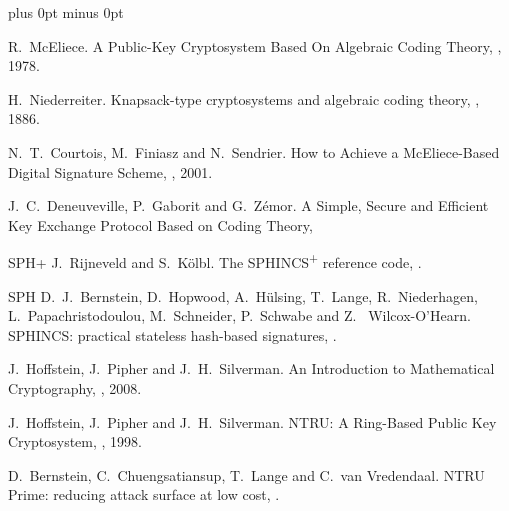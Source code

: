 \documentclass[a4paper,11pt]{article}
\begin{document}
\begin{otherlanguage}{english}
\begin{multicols}{2}


\begin{thebibliography}{1}
\itemsep=0cm plus 0pt minus 0pt

R.~McEliece.
\newblock A Public-Key Cryptosystem Based On Algebraic Coding Theory,
, 1978.

H.~Niederreiter.
\newblock Knapsack-type cryptosystems and algebraic coding theory,
, 1886.

N.~T.~Courtois, M.~Finiasz and N.~Sendrier.
\newblock How to Achieve a McEliece-Based Digital Signature Scheme,
, 2001.

J.~C.~Deneuveville, P.~Gaborit and G.~Zémor.
\newblock A Simple, Secure and Efficient Key Exchange Protocol Based on Coding Theory,

\bibitem
{SPH+}
J.~Rijneveld and S.~Kölbl.
\newblock The SPHINCS\textsuperscript{+} reference code,
.

\bibitem
{SPH}
D.~J.~Bernstein, D.~Hopwood, A.~Hülsing, T.~Lange, R.~Niederhagen, L.~Papachristodoulou, M.~Schneider, P.~Schwabe and Z.~ Wilcox-O’Hearn.
\newblock SPHINCS: practical stateless hash-based signatures,
.

J.~Hoffstein, J.~Pipher and J.~H.~Silverman.
\newblock An Introduction to Mathematical Cryptography,
, 2008.

J.~Hoffstein, J.~Pipher and J.~H.~Silverman.
\newblock NTRU: A Ring-Based Public Key Cryptosystem,
, 1998.

D.~Bernstein, C.~Chuengsatiansup, T.~Lange and C.~van Vredendaal.
\newblock NTRU Prime: reducing attack surface at low cost,
.


\end{thebibliography}
\end{multicols}
\end{otherlanguage}
\end{document}
